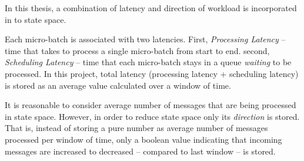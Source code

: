 In this thesis, a combination of latency and direction of workload is incorporated in to state space.
\begin{description}[leftmargin=0pt]
    \item[Latency] Each micro-batch is associated with two latencies. First, \emph{Processing Latency} -- time that takes to process a single micro-batch from start to end. second, \emph{Scheduling Latency} -- time that each micro-batch stays in a queue \emph{waiting} to be processed. In this project, total latency (processing latency + scheduling latency) is stored as an average value calculated over a window of time.
    \item[Workload Direction] It is reasonable to consider average number of messages that are being processed in state space. However, in order to reduce state space only its \emph{direction} is stored. That is, instead of storing a pure number as average number of messages processed per window of time, only a boolean value indicating that incoming messages are increased to decreased -- compared to last window -- is stored.
\end{description}

